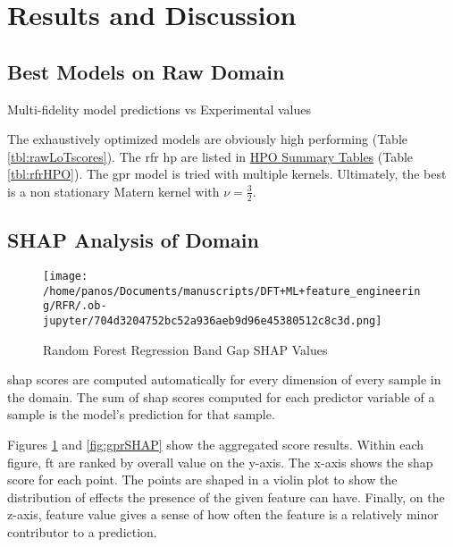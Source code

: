 \documentclass[aip, jmp, amsmath, amssymb, nofootinbib]{revtex4-2}
\begin{document}
\section*{Results and Discussion}
\label{sec:org55dd903}
\subsection*{Best Models on Raw Domain}
\label{sec:orgb56c369}
 
\begin{multicol}
\centering

\caption{\label{fig:pairplots} Multi-fidelity model predictions vs Experimental values}
\end{multicol}

The exhaustively optimized models are obviously high performing (Table
\ref{tbl:rawLoTscores}). The \acrshort{rfr} \gls{hp} are listed in \hyperref[sec:orgbfe97e6]{HPO Summary Tables} (Table \ref{tbl:rfrHPO}). The \acrshort{gpr} model is tried with
multiple kernels. Ultimately, the best is a non stationary Matern
kernel with \(\nu = \frac{3}{2}\).

\subsection*{SHAP Analysis of Domain}
\label{sec:org9496a5d}
\begin{figure}[htbp]
\centering
\texttt{[image: /home/panos/Documents/manuscripts/DFT+ML+feature\_engineering/RFR/.ob-jupyter/704d3204752bc52a936aeb9d96e45380512c8c3d.png]}
\caption{\label{fig:rfrSHAP} Random Forest Regression Band Gap SHAP Values}
\end{figure}

\acrshort{shap} scores are computed automatically for every dimension of every
sample in the domain. The sum of \acrshort{shap} scores computed for each
predictor variable of a sample is the model's prediction for that
sample\cite{lundberg-2017-unified-approac}.

Figures \ref{fig:rfrSHAP} and \ref{fig:gprSHAP} show the aggregated score
results. Within each figure, \gls{ft} are ranked by overall value on
the y-axis. The x-axis shows the \acrshort{shap} score for each point. The points
are shaped in a violin plot to show the distribution of effects the
presence of the given feature can have. Finally, on the z-axis,
feature value gives a sense of how often the feature is a relatively
minor contributor to a prediction.
\end{document}
